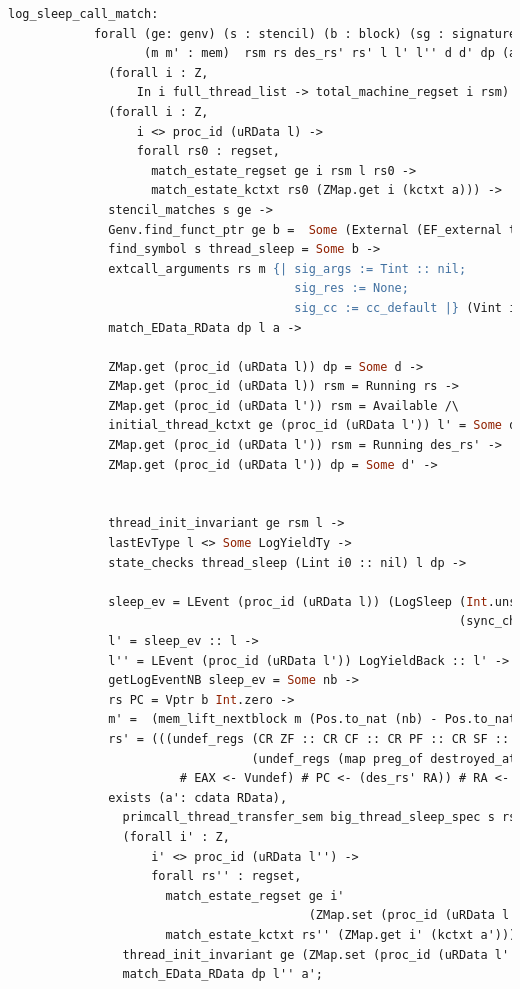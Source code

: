 \begin{lstlisting}[language=Caml]     
          log_sleep_call_match:
            forall (ge: genv) (s : stencil) (b : block) (sg : signature) 
                   (m m' : mem)  rsm rs des_rs' rs' l l' l'' d d' dp (a: cdata RData) nb sleep_ev i0,
              (forall i : Z,
                  In i full_thread_list -> total_machine_regset i rsm) ->
              (forall i : Z,
                  i <> proc_id (uRData l) ->
                  forall rs0 : regset,
                    match_estate_regset ge i rsm l rs0 ->
                    match_estate_kctxt rs0 (ZMap.get i (kctxt a))) ->
              stencil_matches s ge ->
              Genv.find_funct_ptr ge b =  Some (External (EF_external thread_sleep sg)) ->
              find_symbol s thread_sleep = Some b ->
              extcall_arguments rs m {| sig_args := Tint :: nil;
                                        sig_res := None;
                                        sig_cc := cc_default |} (Vint i0 :: nil) ->
              match_EData_RData dp l a ->
              
              ZMap.get (proc_id (uRData l)) dp = Some d ->
              ZMap.get (proc_id (uRData l)) rsm = Running rs ->
              ZMap.get (proc_id (uRData l')) rsm = Available /\
              initial_thread_kctxt ge (proc_id (uRData l')) l' = Some des_rs' \/
              ZMap.get (proc_id (uRData l')) rsm = Running des_rs' ->
              ZMap.get (proc_id (uRData l')) dp = Some d' ->


              thread_init_invariant ge rsm l ->
              lastEvType l <> Some LogYieldTy ->
              state_checks thread_sleep (Lint i0 :: nil) l dp ->

              sleep_ev = LEvent (proc_id (uRData l)) (LogSleep (Int.unsigned i0) (Mem.nextblock m)
                                                               (sync_chpool_check thread_sleep  (Lint i0 :: nil) (uRData l) d)) ->
              l' = sleep_ev :: l ->
              l'' = LEvent (proc_id (uRData l')) LogYieldBack :: l' ->
              getLogEventNB sleep_ev = Some nb ->
              rs PC = Vptr b Int.zero ->
              m' =  (mem_lift_nextblock m (Pos.to_nat (nb) - Pos.to_nat (Mem.nextblock m) % nat)) ->
              rs' = (((undef_regs (CR ZF :: CR CF :: CR PF :: CR SF :: CR OF :: nil)
                                  (undef_regs (map preg_of destroyed_at_call) des_rs'))
                        # EAX <- Vundef) # PC <- (des_rs' RA)) # RA <- Vundef ->
              exists (a': cdata RData),
                primcall_thread_transfer_sem big_thread_sleep_spec s rs (m, a) rs' (m', a') /\
                (forall i' : Z,
                    i' <> proc_id (uRData l'') ->
                    forall rs'' : regset,
                      match_estate_regset ge i'
                                          (ZMap.set (proc_id (uRData l'')) (Running rs') rsm) l'' rs'' ->
                      match_estate_kctxt rs'' (ZMap.get i' (kctxt a'))) /\
                thread_init_invariant ge (ZMap.set (proc_id (uRData l'')) (Running rs') rsm) l'' /\
                match_EData_RData dp l'' a';
\end{lstlisting}
         
